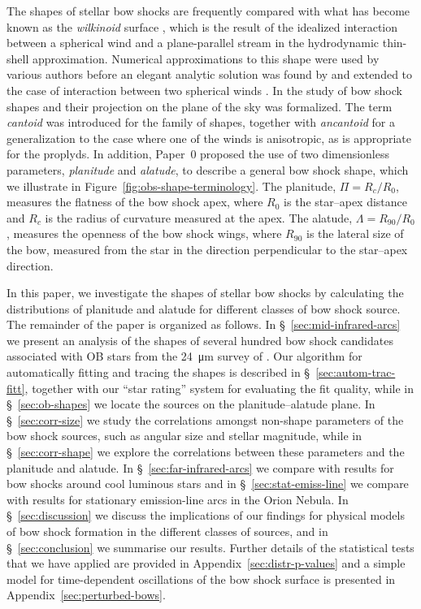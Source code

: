 The shapes of stellar bow shocks are frequently compared with what has
become known as the \textit{wilkinoid} surface \citep{Cox:2012a},
which is the result of the idealized interaction between a spherical
wind and a plane-parallel stream in the hydrodynamic thin-shell
approximation.  Numerical approximations to this shape were used by
various authors \citep{Baranov:1971a, Mac-Low:1991a} before an elegant
analytic solution was found by \citet{Wilkin:1996a} and extended to
the case of interaction between two spherical winds
\citep{Canto:1996}.  In \citet[hereafter, Paper~0]{Tarango-Yong:2018a}
the study of bow shock shapes and their projection on the plane of the
sky was formalized. The term \textit{cantoid} was introduced for the
\citet{Canto:1996} family of shapes, together with \textit{ancantoid}
for a generalization to the case where one of the winds is
anisotropic, as is appropriate for the proplyds.  In addition, Paper~0
proposed the use of two dimensionless parameters, \textit{planitude}
and \textit{alatude}, to describe a general bow shock shape, which we
illustrate in Figure~\ref{fig:obs-shape-terminology}.  The planitude,
\(\Pi = R_c / R_0\), measures the flatness of the bow shock apex, where
\(R_0\) is the star--apex distance and \(R_c\) is the radius of
curvature measured at the apex.  The alatude,
\(\Lambda = R_{90}/R_0\), measures the openness of the bow shock wings,
where \(R_{90}\) is the lateral size of the bow, measured from the
star in the direction perpendicular to the star--apex direction.

In this paper, we investigate the shapes of stellar bow shocks by
calculating the distributions of planitude and alatude for different
classes of bow shock source.  The remainder of the paper is organized
as follows. In \S~\ref{sec:mid-infrared-arcs} we present an analysis
of the shapes of several hundred bow shock candidates associated with
OB stars from the \SI{24}{\um} survey of \citet{Kobulnicky:2016a}.
Our algorithm for automatically fitting and tracing the shapes is
described in \S~\ref{sec:autom-trac-fitt}, together with our ``star
rating'' system for evaluating the fit quality, while in
\S~\ref{sec:ob-shapes} we locate the sources on the planitude--alatude
plane.  In \S~\ref{sec:corr-size} we study the correlations amongst
non-shape parameters of the bow shock sources, such as angular size
and stellar magnitude, while in \S~\ref{sec:corr-shape} we explore the
correlations between these parameters and the planitude and alatude.  In
\S~\ref{sec:far-infrared-arcs} we compare with results for bow shocks
around cool luminous stars and in \S~\ref{sec:stat-emiss-line} we
compare with results for stationary emission-line arcs in the Orion
Nebula.  In \S~\ref{sec:discussion} we discuss the implications of our
findings for physical models of bow shock formation in the different
classes of sources, and in \S~\ref{sec:conclusion} we summarise our
results.  Further details of the statistical tests that we have
applied are provided in Appendix~\ref{sec:distr-p-values} and a simple
model for time-dependent oscillations of the bow shock surface is
presented in Appendix~\ref{sec:perturbed-bows}.

